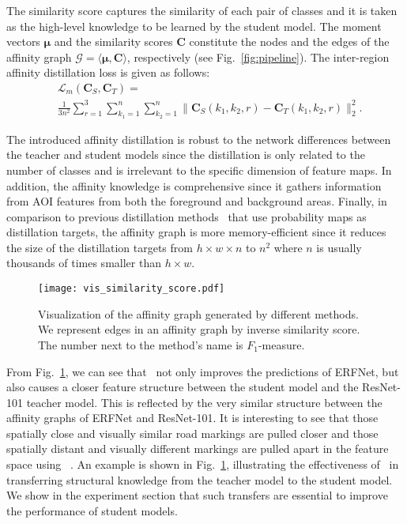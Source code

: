 \documentclass[10pt,twocolumn,letterpaper]{article}
\begin{document}
The similarity score captures the similarity of each pair of classes and it is taken as the high-level knowledge to be learned by the student model. The moment vectors $\boldsymbol{\mu}$ and the similarity scores $\mathbf{C}$ constitute the nodes and the edges of the affinity graph $\mathcal{G}= \langle \boldsymbol{\mu}, \mathbf{C} \rangle$, respectively (see Fig.~\ref{fig:pipeline}). 
The inter-region affinity distillation loss is given as follows:
\begin{equation}
\label{eqn:inter_region_mean_loss}
\begin{split}
& \mathcal{L}_{m}(\mathbf{C}_{S}, \mathbf{C}_{T}) = \\
& \frac{1}{3n^{2}} \sum_{r=1}^{3} \sum_{k_{1}=1}^{n} \sum_{k_{2}=1}^{n} \| \mathbf{C}_{S}(k_{1}, k_{2}, r) - \mathbf{C}_{T}(k_{1}, k_{2}, r) \|_{2}^{2}.
\end{split}
\end{equation}


The introduced affinity distillation is robust to the network differences between the teacher and student models since the distillation is only related to the number of classes and is irrelevant to the specific dimension of feature maps. In addition, the affinity knowledge is comprehensive since it gathers information from AOI features from both the foreground and background areas. Finally, in comparison to previous distillation methods~\cite{hinton2015distilling} that use probability maps as distillation targets, the affinity graph is more memory-efficient since it reduces the size of the distillation targets from $h \times w \times n$ to $n^{2}$ where $n$ is usually thousands of times smaller than $h \times w$.

\begin{figure}[t]
  \centering
  \texttt{[image: vis\_similarity\_score.pdf]}
  \vskip -0.2cm
  \caption{Visualization of the affinity graph generated by different methods. We represent edges in an affinity graph by inverse similarity score. The number next to the method's name is $F_{1}$-measure.}
  \centering
  \vskip -0.6cm
  \label{fig:score}
\end{figure}

From Fig.~\ref{fig:score}, we can see that \algorithmname~not only improves the predictions of ERFNet, but also causes a closer feature structure between the student model and the ResNet-101 teacher model. This is reflected by the very similar structure between the affinity graphs of ERFNet and ResNet-101.
It is interesting to see that those spatially close and visually similar road markings are pulled closer and those spatially distant and visually different markings are pulled apart in the feature space using \algorithmname~. An example is shown in Fig.~\ref{fig:score}, illustrating the effectiveness of \algorithmname~in transferring structural knowledge from the teacher model to the student model. We show in the experiment section that such transfers are essential to improve the performance of student models. 
\end{document}
